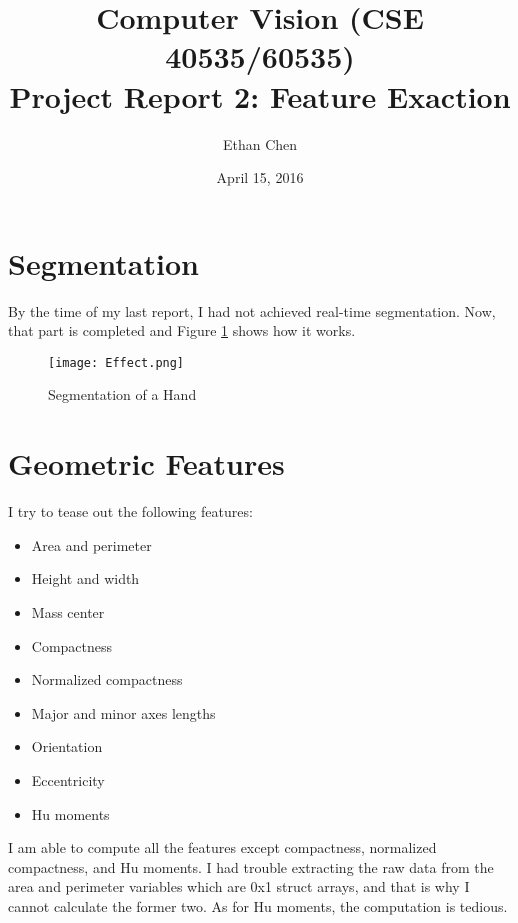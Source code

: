 \documentclass[12pt]{article}
\begin{document}
\title{Computer Vision (CSE 40535/60535)\\Project Report 2: Feature Exaction}
\author{Ethan Chen}
\date{April 15, 2016}
\maketitle

\section{Segmentation}
By the time of my last report, I had not achieved real-time segmentation. Now, that part is completed and Figure \ref{fig:seg} shows how it works.
\begin{figure}[h]
  \centering
    \texttt{[image: Effect.png]}
    \caption{Segmentation of a Hand}
    \label{fig:seg}
\end{figure}

\section{Geometric Features}
I try to tease out the following features:
\begin{itemize}
\item Area and perimeter
\item Height and width
\item Mass center
\item Compactness
\item Normalized compactness
\item Major and minor axes lengths
\item Orientation
\item Eccentricity
\item Hu moments
\end{itemize}
I am able to compute all the features except compactness, normalized compactness, and Hu moments. I had trouble extracting the raw data from the area and perimeter variables which are 0x1 struct arrays, and that is why I cannot calculate the former two. As for Hu moments, the computation is tedious.
\end{document}
